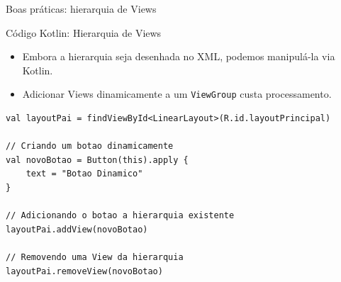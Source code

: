 \documentclass[aspectratio=169]{beamer}
\begin{document}
\begin{frame}{Boas práticas: hierarquia de Views}
\begin{center}

\end{center}


\end{frame}
\begin{frame}[fragile]{Código Kotlin: Hierarquia de Views}
\begin{itemize}
    \item Embora a hierarquia seja desenhada no XML, podemos manipulá-la via Kotlin.
    \item Adicionar Views dinamicamente a um \texttt{ViewGroup} custa processamento.
\end{itemize}
\vspace{0.2cm}
\begin{lstlisting}[style=KotlinStyle]
val layoutPai = findViewById<LinearLayout>(R.id.layoutPrincipal)

// Criando um botao dinamicamente
val novoBotao = Button(this).apply {
    text = "Botao Dinamico"
}

// Adicionando o botao a hierarquia existente
layoutPai.addView(novoBotao)

// Removendo uma View da hierarquia
layoutPai.removeView(novoBotao)
\end{lstlisting}
\end{frame}
\end{document}
